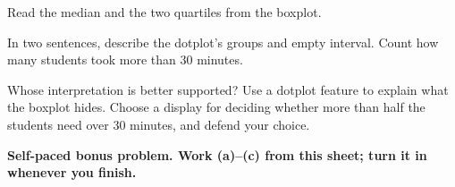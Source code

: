 \documentclass[14pt]{extarticle}
\begin{document}
\begin{description}[leftmargin=1.15in, labelwidth=1in, itemsep=2pt, topsep=2pt]
  \item[\dokbadge{1}~(a)] Read the median and the two quartiles from the boxplot.
  \item[\dokbadge{2}~(b)] In two sentences, describe the dotplot's groups and empty interval. Count how many students took more than 30 minutes.
  \item[\dokbadge{3}~(c)] Whose interpretation is better supported? Use a dotplot feature to explain what the boxplot hides. Choose a display for deciding whether more than half the students need over 30 minutes, and defend your choice.
\end{description}

\vfill
\textbf{Self-paced bonus problem. Work (a)--(c) from this sheet; turn it in whenever you finish.}
\end{document}
